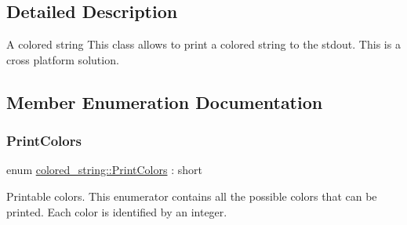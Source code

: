 \subsection{Detailed Description}
A colored string This class allows to print a colored string to the stdout. This is a cross platform solution. 

\subsection{Member Enumeration Documentation}
\mbox{\label{classcolored__string_a76416a7db18c947e5a6d5bf17c78e497}} 
\subsubsection{\texorpdfstring{PrintColors}{PrintColors}}
{\footnotesize\ttfamily enum \mbox{\hyperlink{classcolored__string_a76416a7db18c947e5a6d5bf17c78e497}{colored\+\_\+string\+::\+Print\+Colors}} \+: short\hspace{0.3cm}{\ttfamily [strong]}}



Printable colors. This enumerator contains all the possible colors that can be printed. Each color is identified by an integer. 

